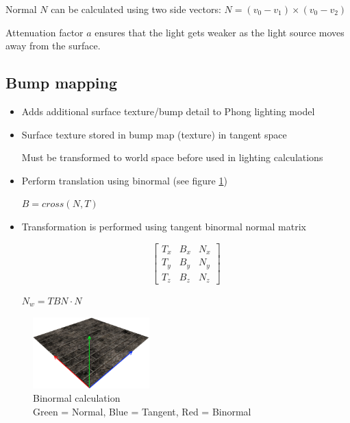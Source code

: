 \documentclass[a4paper]{article}
\begin{document}
Normal $N$ can be calculated using two side vectors: $N = (v_{0} - v_{1}) \times
(v_{0} - v_{2})$

Attenuation factor $a$ ensures that the light gets weaker as the light source
moves away from the surface.

\subsection{Bump mapping}

\begin{itemize}
  \item
    Adds additional surface texture/bump detail to Phong lighting model

  \item
    Surface texture stored in bump map (texture) in tangent space

    Must be transformed to world space before used in lighting calculations

  \item
    Perform translation using binormal (see figure \ref{fig:binormal_calc})

    $B = cross(N, T)$

  \item
    Transformation is performed using tangent binormal normal matrix

    \[
      \left [
        \begin{array}{ccc}
          T_{x} & B_{x} & N_{x} \\
          T_{y} & B_{y} & N_{y} \\
          T_{z} & B_{z} & N_{z}
        \end{array}
      \right ]
    \]

    $N_{w} = TBN \cdot N$

\end{itemize}

\begin{figure}[h!]
  \centering
  \includegraphics[width=0.4\textwidth]{graphics/binormal_calc.eps}
  \caption{Binormal calculation \\
           Green = Normal, Blue = Tangent, Red = Binormal}
  \label{fig:binormal_calc}
\end{figure}
\FloatBarrier
\end{document}
